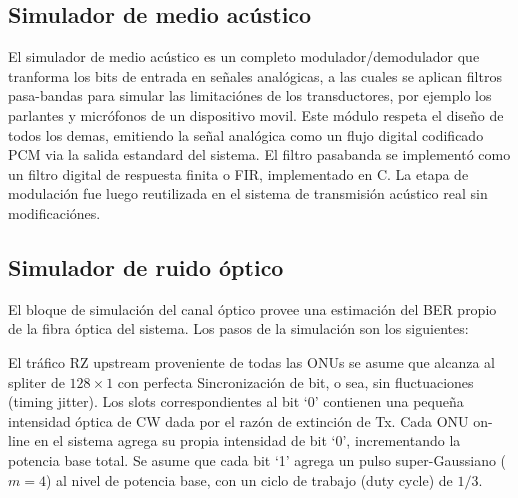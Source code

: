 \subsection{Simulador de medio acústico}
El simulador de medio acústico es un completo modulador/demodulador que tranforma los bits de entrada en señales analógicas, a las cuales se aplican filtros pasa-bandas para simular las limitaciónes de los transductores, por ejemplo los parlantes y micrófonos de un dispositivo movil. Este módulo respeta el diseño de todos los demas, emitiendo la señal analógica como un flujo digital codificado PCM via la salida estandard del sistema. El filtro pasabanda se implementó como un filtro digital de respuesta finita o FIR, implementado en C.
La etapa de modulación fue luego reutilizada en el sistema de transmisión acústico real sin modificaciónes.

\subsection{Simulador de ruido óptico}

El bloque de simulación del canal óptico provee una estimación del BER propio de la fibra óptica del sistema. Los pasos de la simulación son los siguientes:

El tráfico RZ upstream proveniente de todas las ONUs se asume que alcanza al spliter de $128\times1$ con perfecta Sincronización de bit, o sea, sin fluctuaciones (timing jitter).
Los slots correspondientes al bit `0' contienen una pequeña intensidad óptica de CW dada por el razón de extinción de Tx.
Cada ONU on-line en el sistema agrega su propia intensidad de bit `0', incrementando la potencia base total.
Se asume que cada bit `1' agrega un pulso super-Gaussiano ($m=4$) al nivel de potencia base, con un ciclo de trabajo (duty cycle) de $1/3$.


